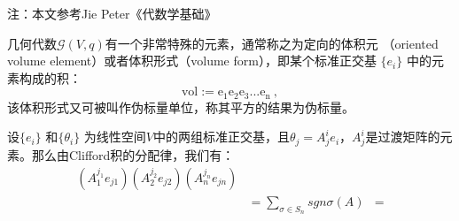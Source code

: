
注：本文参考Jie Peter《代数学基础》

几何代数$\mathcal G(V,q)$有一个非常特殊的元素，通常称之为定向的体积元
（oriented volume element）或者体积形式（volume form），即某个标准正交基 $\{e_i\}$ 中的元素构成的积：
$$\mathrm {vol:=e_1e_2e_3...e_n}~,$$
该体积形式又可被叫作伪标量单位，称其平方的结果为伪标量。

设$\{e_i\}$ 和$\{\theta_i\}$ 为线性空间$V$中的两组标准正交基，且$\theta_j=A^i_j e_i$，$A^i_j$是过渡矩阵的元素。那么由Clifford积的分配律，我们有：
\begin{equation}
\begin{aligned}
(A^{j_1}_1 e_{j1})(A^{j_2}_2 e_{j2})(A^{j_n}_n e_{jn})\\
&=\sum_{\sigma\in S_n} sgn\sigma(A)
&=
\end{aligned}
\end{equation}
